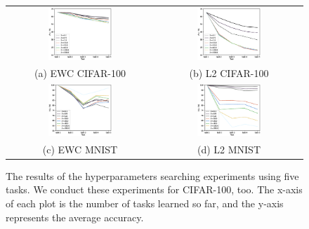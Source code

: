 \documentclass[final]{cvpr}
\begin{document}
\begin{figure}[t]
    \centering
	\begin{tabular}{c@{\hskip0.5cm}c}
		\includegraphics[width=0.45\textwidth]{resources/ewc_CIFAR.eps}&%
        \includegraphics[width=0.45\textwidth]{resources/l2_CIFAR.eps}\\%
        (a) EWC CIFAR-100 & (b) L2 CIFAR-100\\
        \includegraphics[width=0.45\textwidth]{resources/ewc_MNIST.eps}&%
        \includegraphics[width=0.45\textwidth]{resources/l2_MNIST.eps}\\%
		(c) EWC MNIST  & (d) L2 MNIST \\
	\end{tabular}\vspace{0.2cm}
	\caption{The results of the hyperparameters searching experiments using five tasks. We conduct these experiments for CIFAR-100, too. The x-axis of each plot is the number of tasks learned so far, and the y-axis represents the average accuracy.}
    \label{hyper}
\end{figure}
\end{document}
